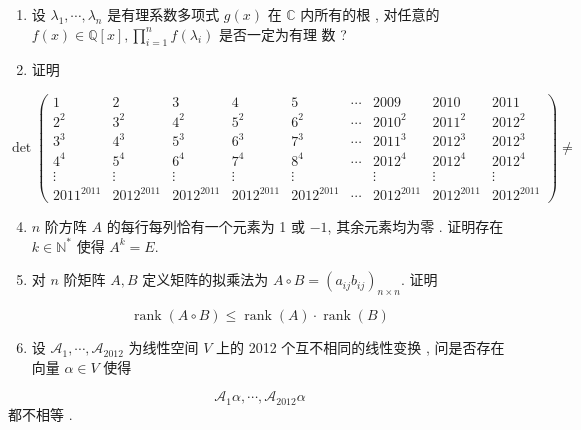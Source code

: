 \documentclass[10pt]{article}
\begin{document}
\begin{enumerate}
  \item  设  $\lambda_{1}, \cdots, \lambda_{n}$  是有理系数多项式  $g(x)$  在  $\mathbb{C}$  内所有的根 ,  对任意的  $f(x) \in \mathbb{Q}[x], \prod_{i=1}^{n} f\left(\lambda_{i}\right)$  是否一定为有理   数 ?

  \item  证明 

\end{enumerate}
$$
\operatorname{det}\left(\begin{array}{ccccccccc}
1 & 2 & 3 & 4 & 5 & \cdots & 2009 & 2010 & 2011 \\
2^{2} & 3^{2} & 4^{2} & 5^{2} & 6^{2} & \cdots & 2010^{2} & 2011^{2} & 2012^{2} \\
3^{3} & 4^{3} & 5^{3} & 6^{3} & 7^{3} & \cdots & 2011^{3} & 2012^{3} & 2012^{3} \\
4^{4} & 5^{4} & 6^{4} & 7^{4} & 8^{4} & \cdots & 2012^{4} & 2012^{4} & 2012^{4} \\
\vdots & \vdots & \vdots & \vdots & \vdots & & \vdots & \vdots & \vdots \\
2011^{2011} & 2012^{2011} & 2012^{2011} & 2012^{2011} & 2012^{2011} & \cdots & 2012^{2011} & 2012^{2011} & 2012^{2011}
\end{array}\right) \neq
$$

\begin{enumerate}
  \setcounter{enumi}{3}
  \item $n$  阶方阵  $A$  的每行每列恰有一个元素为  1  或  $-1$,  其余元素均为零 .  证明存在  $k \in \mathbb{N}^{*}$  使得  $A^{k}=E$.

  \item  对  $n$  阶矩阵  $A, B$  定义矩阵的拟乘法为  $A \circ B=\left(a_{i j} b_{i j}\right)_{n \times n}$.  证明 

\end{enumerate}
$$
\operatorname{rank}(A \circ B) \leqslant \operatorname{rank}(A) \cdot \operatorname{rank}(B)
$$

\begin{enumerate}
  \setcounter{enumi}{5}
  \item  设  $\mathcal{A}_{1}, \cdots, \mathcal{A}_{2012}$  为线性空间  $V$  上的  2012  个互不相同的线性变换 ,  问是否存在向量  $\alpha \in V$  使得 
\end{enumerate}
$$
\mathcal{A}_{1} \alpha, \cdots, \mathcal{A}_{2012} \alpha
$$
 都不相等 .
\end{document}
